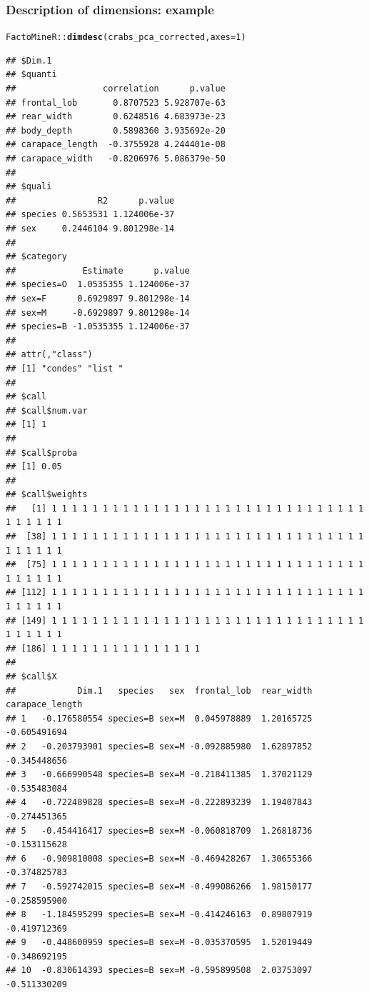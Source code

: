 \documentclass{beamer}\usepackage[]{graphicx}\usepackage[]{color}
\makeatletter
\newcommand{\hlnum}[1]{\textcolor[rgb]{0.686,0.059,0.569}{#1}}%
\newcommand{\hlopt}[1]{\textcolor[rgb]{0,0,0}{#1}}%
\newcommand{\hlstd}[1]{\textcolor[rgb]{0.345,0.345,0.345}{#1}}%
\newcommand{\hlkwc}[1]{\textcolor[rgb]{0.333,0.667,0.333}{#1}}%
\newcommand{\hlkwd}[1]{\textcolor[rgb]{0.737,0.353,0.396}{\textbf{#1}}}%
\newenvironment{kframe}{%
 \def\at@end@of@kframe{}%
 \ifinner\ifhmode%
  \def\at@end@of@kframe{\end{minipage}}%
  \begin{minipage}{\columnwidth}%
 \fi\fi%
 \def\FrameCommand##1{\hskip\@totalleftmargin \hskip-\fboxsep
 \colorbox{shadecolor}{##1}\hskip-\fboxsep
     \hskip-\linewidth \hskip-\@totalleftmargin \hskip\columnwidth}%
 \MakeFramed {\advance\hsize-\width
   \@totalleftmargin\z@ \linewidth\hsize
   \@setminipage}}%
 {\par\unskip\endMakeFramed%
 \at@end@of@kframe}
\newenvironment{knitrout}{}{} %
\makeatother
\begin{document}
\begin{frame}[fragile]
\frametitle{Description of  dimensions: example}
\begin{knitrout}\scriptsize
{}\color{fgcolor}\begin{kframe}
\begin{alltt}
\hlstd{FactoMineR}\hlopt{::}\hlkwd{dimdesc}\hlstd{(crabs_pca_corrected,} \hlkwc{axes} \hlstd{=} \hlnum{1}\hlstd{)}
\end{alltt}
\begin{verbatim}
## $Dim.1
## $quanti
##                 correlation      p.value
## frontal_lob       0.8707523 5.928707e-63
## rear_width        0.6248516 4.683973e-23
## body_depth        0.5898360 3.935692e-20
## carapace_length  -0.3755928 4.244401e-08
## carapace_width   -0.8206976 5.086379e-50
## 
## $quali
##                R2      p.value
## species 0.5653531 1.124006e-37
## sex     0.2446104 9.801298e-14
## 
## $category
##             Estimate      p.value
## species=O  1.0535355 1.124006e-37
## sex=F      0.6929897 9.801298e-14
## sex=M     -0.6929897 9.801298e-14
## species=B -1.0535355 1.124006e-37
## 
## attr(,"class")
## [1] "condes" "list " 
## 
## $call
## $call$num.var
## [1] 1
## 
## $call$proba
## [1] 0.05
## 
## $call$weights
##   [1] 1 1 1 1 1 1 1 1 1 1 1 1 1 1 1 1 1 1 1 1 1 1 1 1 1 1 1 1 1 1 1 1 1 1 1 1 1
##  [38] 1 1 1 1 1 1 1 1 1 1 1 1 1 1 1 1 1 1 1 1 1 1 1 1 1 1 1 1 1 1 1 1 1 1 1 1 1
##  [75] 1 1 1 1 1 1 1 1 1 1 1 1 1 1 1 1 1 1 1 1 1 1 1 1 1 1 1 1 1 1 1 1 1 1 1 1 1
## [112] 1 1 1 1 1 1 1 1 1 1 1 1 1 1 1 1 1 1 1 1 1 1 1 1 1 1 1 1 1 1 1 1 1 1 1 1 1
## [149] 1 1 1 1 1 1 1 1 1 1 1 1 1 1 1 1 1 1 1 1 1 1 1 1 1 1 1 1 1 1 1 1 1 1 1 1 1
## [186] 1 1 1 1 1 1 1 1 1 1 1 1 1 1 1
## 
## $call$X
##            Dim.1   species   sex  frontal_lob  rear_width carapace_length
## 1   -0.176580554 species=B sex=M  0.045978889  1.20165725    -0.605491694
## 2   -0.203793901 species=B sex=M -0.092885980  1.62897852    -0.345448656
## 3   -0.666990548 species=B sex=M -0.218411385  1.37021129    -0.535483084
## 4   -0.722489828 species=B sex=M -0.222893239  1.19407843    -0.274451365
## 5   -0.454416417 species=B sex=M -0.060818709  1.26818736    -0.153115628
## 6   -0.909810008 species=B sex=M -0.469428267  1.30655366    -0.374825783
## 7   -0.592742015 species=B sex=M -0.499086266  1.98150177    -0.258595900
## 8   -1.184595299 species=B sex=M -0.414246163  0.89807919    -0.419712369
## 9   -0.448600959 species=B sex=M -0.035370595  1.52019449    -0.348692195
## 10  -0.830614393 species=B sex=M -0.595899508  2.03753097    -0.511330209

\end{verbatim}
\end{kframe}
\end{knitrout}
\end{frame}
\end{document}
